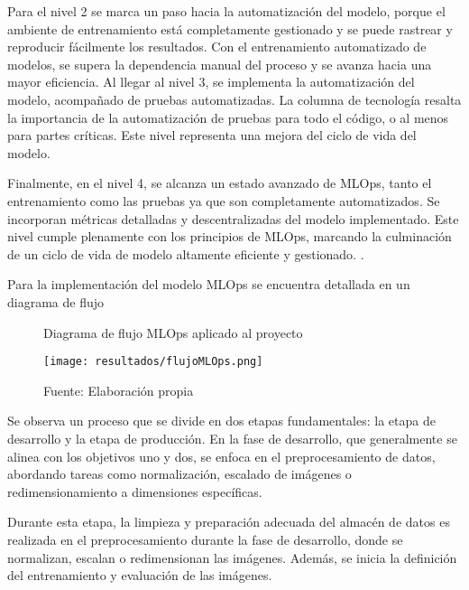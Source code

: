 Para el nivel 2 se marca un paso hacia la automatización del modelo, porque el ambiente de entrenamiento está completamente gestionado y se puede rastrear y reproducir fácilmente los resultados. Con el entrenamiento automatizado de modelos, se supera la dependencia manual del proceso y se avanza hacia una mayor eficiencia. Al llegar al nivel 3, se implementa la automatización del modelo, acompañado de pruebas automatizadas. La columna de tecnología resalta la importancia de la automatización de pruebas para todo el código, o al menos para partes críticas. Este nivel representa una mejora del ciclo de vida del modelo. \newline

Finalmente, en el nivel 4, se alcanza un estado avanzado de MLOps, tanto el entrenamiento como las pruebas ya que son completamente automatizados. Se incorporan métricas detalladas y descentralizadas del modelo implementado. Este nivel cumple plenamente con los principios de MLOps, marcando la culminación de un ciclo de vida de modelo altamente eficiente y gestionado. \citep{rivero2022, visengeriyeva2020}.

Para la implementación del modelo MLOps se encuentra detallada en un diagrama de flujo

\newpage

\begin{landscape}
	\thispagestyle{empty}
	\begin{figure}[htbp]
		\centering
		\caption{Diagrama de flujo MLOps aplicado al proyecto}
		\texttt{[image: resultados/flujoMLOps.png]}
		\caption*{\footnotesize Fuente: Elaboración propia}
		\label{fig:figuraFlujoMLOps}
	\end{figure}
\end{landscape}

\newpage

Se observa un proceso que se divide en dos etapas fundamentales: la etapa de desarrollo y la etapa de producción. En la fase de desarrollo, que generalmente se alinea con los objetivos uno y dos, se enfoca en el preprocesamiento de datos, abordando tareas como normalización, escalado de imágenes o redimensionamiento a dimensiones específicas. \newline

Durante esta etapa, la limpieza y preparación adecuada del almacén de datos es realizada en el preprocesamiento durante la fase de desarrollo, donde se normalizan, escalan o redimensionan las imágenes. Además, se inicia la definición del entrenamiento y evaluación de las imágenes.

